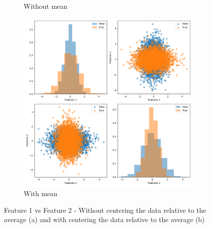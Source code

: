\begin{enumerate}
\begin{figure}[h!]
\begin{subfigure}[b]{0.4\linewidth}
            \caption{Without mean}
            \label{fig:feature1vs2a}
        \end{subfigure}
        \begin{subfigure}[b]{0.4\linewidth}
            \includegraphics[width=\linewidth]{Lab/02. Lab 02/Images/02. Graphics Features 1_2 With Mean}
            \caption{With mean}
            \label{fig:feature1vs2b}
        \end{subfigure}
        \caption{Feature 1 vs Feature 2 - Without centering the data relative to the average (a)
            and with centering the data relative to the average (b)}
        \label{fig:feature1vs2}
    \end{figure}



\end{enumerate}

